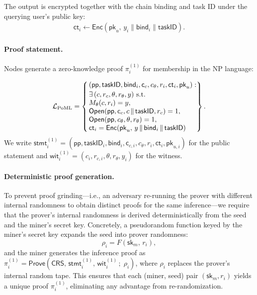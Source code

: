 The output is encrypted together with the chain binding and task ID under the querying user's public key:
\begin{align}
\label{eq:ct}
\mathsf{ct}_i \leftarrow \mathsf{Enc}(\mathsf{pk}_u,\, y_i \parallel \mathsf{bind}_i \parallel \mathsf{taskID}).
\end{align}

\paragraph{Proof statement.}
Nodes generate a zero-knowledge proof $\pi_i^{(1)}$ for membership in the NP language:

\[
\mathcal{L}_{\text{PoML}} 
= \left\{\,
  \begin{array}{@{}l@{}}
    (\mathsf{pp},\mathsf{taskID},\mathsf{bind}_i,\mathsf{c}_c,c_\theta, r_i, \mathsf{ct}_i, \mathsf{pk}_u):\\[0.2em]
    \exists\,(c,r_c,\theta,r_\theta,y) \ \text{s.t.} \\
    M_\theta(c, r_i)=y, \\
    \mathsf{Open}(\mathsf{pp},\mathsf{c}_c,c \,\|\, \mathsf{taskID},r_c) = 1, \\
    \mathsf{Open}(\mathsf{pp},c_\theta,\theta, r_\theta) = 1, \\
    \mathsf{ct}_i = \mathsf{Enc}(\mathsf{pk}_u,\, y \,\|\, \mathsf{bind}_i \,\|\, \mathsf{taskID})
  \end{array}
\right\}.
\]
We write $\mathsf{stmt}_i^{(1)} = (\mathsf{pp},\mathsf{taskID}_i,\mathsf{bind}_i,\mathsf{c}_{c,i},c_\theta, r_i, \mathsf{ct}_i, \mathsf{pk}_{u,i})$ for the public statement and $\mathsf{wit}_i^{(1)} = (c_i,r_{c,i},\theta,r_\theta,y_i)$ for the witness.

\paragraph{Deterministic proof generation.}
To prevent proof grinding---i.e., an adversary re-running the prover with different internal randomness to obtain distinct proofs for the same inference---we require that the prover's internal randomness is derived deterministically from the seed and the miner's secret key. Concretely, a pseudorandom function keyed by the miner's secret key expands the seed into prover randomness:
\[
\rho_i = F(\mathsf{sk}_m,\, r_i),
\]
and the miner generates the inference proof as \\ $\pi_i^{(1)} = \mathsf{Prove}(\mathsf{CRS},\, \mathsf{stmt}_i^{(1)},\, \mathsf{wit}_i^{(1)}\,;\; \rho_i)$, where $\rho_i$ replaces the prover's internal random tape. This ensures that each (miner, seed) pair $(\mathsf{sk}_m, r_i)$ yields a unique proof $\pi_i^{(1)}$, eliminating any advantage from re-randomization.

